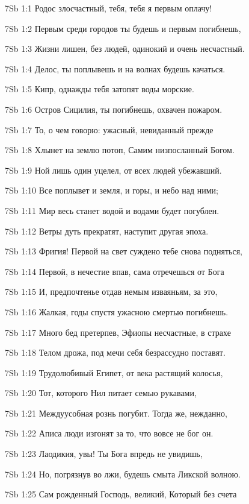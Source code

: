 \vs 7Sb 1:1 Родос злосчастный, тебя, тебя я первым оплачу! 

\vs 7Sb 1:2 Первым среди городов ты будешь и первым погибнешь, 

\vs 7Sb 1:3 Жизни лишен, без людей, одинокий и очень несчастный.

\vs 7Sb 1:4 Делос, ты поплывешь и на волнах будешь качаться. 

\vs 7Sb 1:5 Кипр, однажды тебя затопят воды морские.

\vs 7Sb 1:6 Остров Сицилия, ты погибнешь, охвачен пожаром.

\vs 7Sb 1:7 То, о чем говорю: ужасный, невиданный прежде 

\vs 7Sb 1:8 Хлынет на землю потоп, Самим низпосланный Богом.

\vs 7Sb 1:9 Ной лишь один уцелел, от всех людей убежавший.

\vs 7Sb 1:10 Все поплывет  и земля, и горы, и небо над ними; 

\vs 7Sb 1:11 Мир весь станет водой и водами будет погублен. 

\vs 7Sb 1:12 Ветры дуть прекратят, наступит другая эпоха.

\vs 7Sb 1:13 Фригия! Первой на свет суждено тебе снова подняться, 

\vs 7Sb 1:14 Первой, в нечестие впав, сама отречешься от Бога 

\vs 7Sb 1:15 И, предпочтенье отдав немым изваяньям, за это, 

\vs 7Sb 1:16 Жалкая, годы спустя ужасною смертью погибнешь.

\vs 7Sb 1:17 Много бед претерпев, Эфиопы несчастные, в страхе 

\vs 7Sb 1:18 Телом дрожа, под мечи себя безрассудно поставят.

\vs 7Sb 1:19 Трудолюбивый Египет, от века растящий колосья, 

\vs 7Sb 1:20 Тот, которого Нил питает семью рукавами, 

\vs 7Sb 1:21 Междуусобная рознь погубит. Тогда же, нежданно, 

\vs 7Sb 1:22 Аписа люди изгонят за то, что вовсе не бог он.

\vs 7Sb 1:23 Лаодикия, увы! Ты Бога впредь не увидишь,

\vs 7Sb 1:24 Но, погрязнув во лжи, будешь смыта Ликской волною.

\vs 7Sb 1:25 Сам рожденный Господь, великий, Который без счета 

